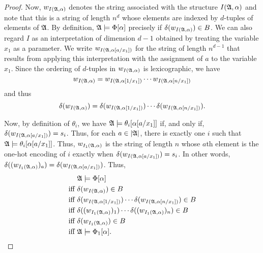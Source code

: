 \documentclass[a4paper,UKenglish,cleveref, autoref, thm-restate, anonymous]{lipics-v2021}
\begin{document}
\begin{proof}
      Now, $w_{I(\mathfrak{A},\alpha)}$ denotes the string associated with the structure $I(\mathfrak{A},\alpha)$ and note that this is a string of length $n^d$ whose elements are indexed by $d$-tuples of elements of $\mathfrak{A}$.  By definition, $\mathfrak{A} \models \Phi[\alpha]$ precisely if $\delta(w_{I(\mathfrak{A},\alpha)}) \in B$.  We can also regard $I$ as an interpretation of dimension $d-1$ obtained by treating the variable $x_1$ as a parameter.  We write $w_{I(\mathfrak{A},\alpha[a/x_1])}$ for the string of length $n^{d-1}$ that results from applying this interpretation with the assignment of $a$ to the variable $x_1$.  Since the ordering of $d$-tuples in $w_{I(\mathfrak{A},\alpha)}$ is lexicographic, we have
\[
        w_{I(\mathfrak{A},\alpha)} = w_{I(\mathfrak{A},\alpha[1/x_1])}\cdots w_{I(\mathfrak{A},\alpha[n/x_1])}
\]
      and thus
\[
        \delta(w_{I(\mathfrak{A},\alpha)}) = \delta(w_{I(\mathfrak{A},\alpha[1/x_1])})\cdots \delta(w_{I(\mathfrak{A},\alpha[n/x_1])}).
\]

      Now, by definition of $\theta_i$, we have $\mathfrak{A} \models \theta_i[\alpha[a/x_1]]$ if, and only if, $\delta(w_{I(\mathfrak{A},\alpha[a/x_1])}) = s_i$.  Thus, for each $a \in |\mathfrak{A}|$, there is exactly one $i$ such that  $\mathfrak{A} \models \theta_i[\alpha[a/x_1]]$.  Thus, 
      $w_{I_1(\mathfrak{A},\alpha)}$ is the string of length $n$ whose  $a$th element is the one-hot encoding of $i$ exactly when $\delta(w_{I(\mathfrak{A},\alpha[a/x_1])}) = s_i$.  In other words, $\delta((w_{I_1(\mathfrak{A},\alpha)})_a) = \delta(w_{I(\mathfrak{A},\alpha[a/x_1])})$.
      Thus,
    \begin{align*}
        & \mathfrak{A} \models \Phi[\alpha] \\
        \text{iff}\ & \delta(w_{I(\mathfrak{A},\alpha)}) \in B \\
        \text{iff}\ & \delta(w_{I(\mathfrak{A},\alpha[1/x_1])})\cdots \delta(w_{I(\mathfrak{A},\alpha[n/x_1])}) \in B \\
        \text{iff}\ & \delta((w_{I_1(\mathfrak{A},\alpha)})_1)\cdots \delta((w_{I_1(\mathfrak{A},\alpha)})_n) \in B \\
        \text{iff}\ & \delta(w_{I_1(\mathfrak{A},\alpha)}) \in B \\
        \text{iff}\ & \mathfrak{A} \models \Phi_1[\alpha].
    \end{align*}

    \end{proof}
\end{document}
